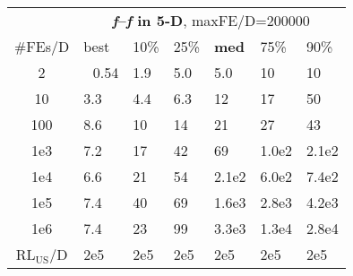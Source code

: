 \begin{tabular}{c|llllll}
 & \multicolumn{6}{|c}{\textbf{\textit{f}\raisebox{-0.35ex}{1}--\textit{f}\raisebox{-0.35ex}{24} in 5-D}, maxFE/D=200000}\\
\#FEs/D & best & 10\% & 25\% & \textbf{med} & 75\% & 90\%\\
2 & ~\,0.54 & \hspace*{1ex}1.9 & \hspace*{1ex}5.0 & \hspace*{1ex}5.0 & 10 & 10\\
10 & \hspace*{1ex}3.3 & \hspace*{1ex}4.4 & \hspace*{1ex}6.3 & 12 & 17 & 50\\
100 & \hspace*{1ex}8.6 & 10 & 14 & 21 & 27 & 43\\
1e3 & \hspace*{1ex}7.2 & 17 & 42 & 69 & 1.0e2 & 2.1e2\\
1e4 & \hspace*{1ex}6.6 & 21 & 54 & 2.1e2 & 6.0e2 & 7.4e2\\
1e5 & \hspace*{1ex}7.4 & 40 & 69 & 1.6e3 & 2.8e3 & 4.2e3\\
1e6 & \hspace*{1ex}7.4 & 23 & 99 & 3.3e3 & 1.3e4 & 2.8e4\\
$\text{RL}_{\text{US}}$/D & 2e5 & 2e5 & 2e5 & 2e5 & 2e5 & 2e5
\end{tabular}
